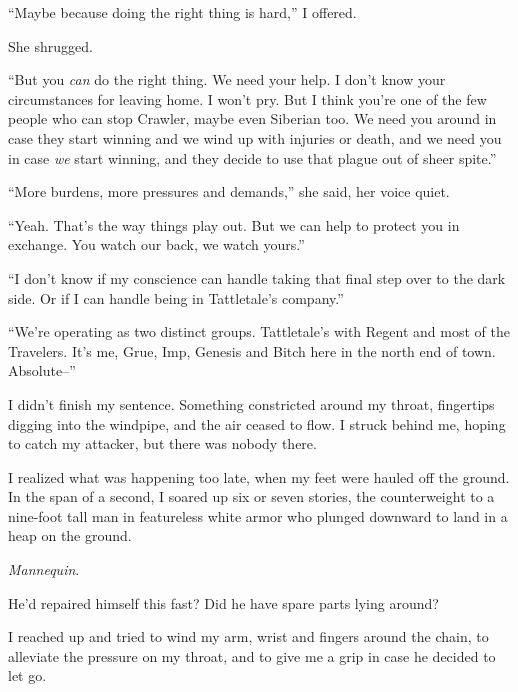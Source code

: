 ``Maybe because doing the right thing is hard,'' I offered.



She shrugged.



``But you \emph{can} do the right thing.  We need your help.  I don't know your circumstances for leaving home.  I won't pry.  But I think you're one of the few people who can stop Crawler, maybe even Siberian too.  We need you around in case they start winning and we wind up with injuries or death, and we need you in case \emph{we} start winning, and they decide to use that plague out of sheer spite.''



``More burdens, more pressures and demands,'' she said, her voice quiet.



``Yeah.  That's the way things play out.  But we can help to protect you in exchange.  You watch our back, we watch yours.''



``I don't know if my conscience can handle taking that final step over to the dark side.  Or if I can handle being in Tattletale's company.''



``We're operating as two distinct groups.  Tattletale's with Regent and most of the Travelers.  It's me, Grue, Imp, Genesis and Bitch here in the north end of town.  Absolute--''



I didn't finish my sentence.  Something constricted around my throat, fingertips digging into the windpipe, and the air ceased to flow.  I struck behind me, hoping to catch my attacker, but there was nobody there.



I realized what was happening too late, when my feet were hauled off the ground.  In the span of a second, I soared up six or seven stories, the counterweight to a nine-foot tall man in featureless white armor who plunged downward to land in a heap on the ground.



\emph{Mannequin}.



He'd repaired himself this fast?  Did he have spare parts lying around?



I reached up and tried to wind my arm, wrist and fingers around the chain, to alleviate the pressure on my throat, and to give me a grip in case he decided to let go.



